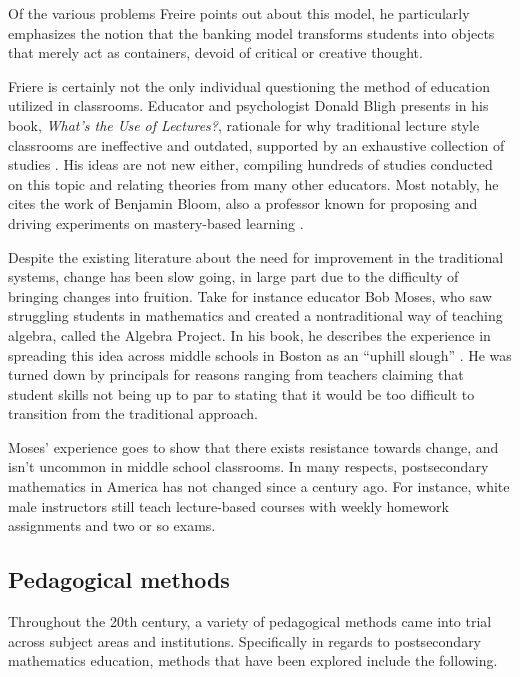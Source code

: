 Of the various problems Freire points out about this model, he particularly emphasizes the notion that the banking model transforms students into objects that merely act as containers, devoid of critical or creative thought.

Friere is certainly not the only individual questioning the method of education utilized in classrooms. Educator and psychologist Donald Bligh presents in his book, {\it What's the Use of Lectures?}, rationale for why traditional lecture style classrooms are ineffective and outdated, supported by an exhaustive collection of studies \citep{bligh_whats_1998}. His ideas are not new either, compiling hundreds of studies conducted on this topic and relating theories from many other educators. Most notably, he cites the work of Benjamin Bloom, also a professor known for proposing and driving experiments on mastery-based learning \citep{bligh_whats_1998}.

Despite the existing literature about the need for improvement in the traditional systems, change has been slow going, in large part due to the difficulty of bringing changes into fruition. Take for instance educator Bob Moses, who saw struggling students in mathematics and created a nontraditional way of teaching algebra, called the Algebra Project. In his book, he describes the experience in spreading this idea across middle schools in Boston as an ``uphill slough'' \citep{moses_radical_2001}. He was turned down by principals for reasons ranging from teachers claiming that student skills not being up to par to stating that it would be too difficult to transition from the traditional approach.

Moses' experience goes to show that there exists resistance towards change, and isn't uncommon in middle school classrooms. In many respects, postsecondary mathematics in America has not changed since a century ago. For instance, white male instructors still teach lecture-based courses with weekly homework assignments and two or so exams.

\subsection{Pedagogical methods}
Throughout the 20th century, a variety of pedagogical methods came into trial across subject areas and institutions. Specifically in regards to postsecondary mathematics education, methods that have been explored include the following.

